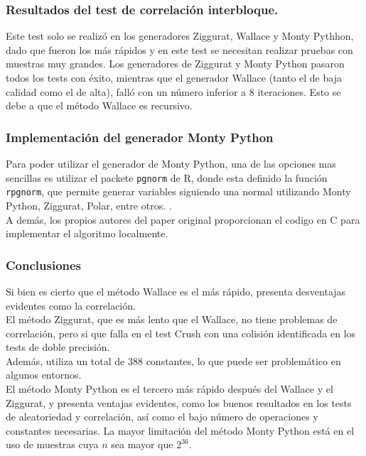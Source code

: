 \documentclass[a4paper,12pt]{article}
\begin{document}
	\subsubsection{Resultados del test de correlación interbloque.}
	Este test solo se realizó en los generadores Ziggurat, Wallace y Monty Pythhon, dado que fueron los más rápidos y en este test se necesitan realizar pruebas con muestras muy grandes. Los generadores de Ziggurat y Monty Python pasaron todos los tests con éxito, mientras que el generador Wallace (tanto el de baja calidad como el de alta), falló con un número inferior a $8$ iteraciones. Esto se debe a que el método Wallace es recursivo.
	
	\subsubsection{Implementación del generador Monty Python}
	Para poder utilizar el generador de Monty Python, una de las opciones mas sencillas es utilizar el packete \texttt{pgnorm} de R, donde esta definido la función \texttt{rpgnorm},
	que permite generar variables siguiendo una normal utilizando Monty Python, Ziggurat, Polar, entre otros. \cite{mp}. \\
	A demás, los propios autores del paper original proporcionan el codigo en C para implementar el algoritmo localmente.

	\subsubsection{Conclusiones}
	Si bien es cierto que el método Wallace es el más rápido, presenta desventajas evidentes como la correlación. \\
 
	El método Ziggurat, que es más lento que el Wallace, no tiene problemas de correlación, pero si que falla en el test Crush con una colisión identificada en los tests de doble precisión. \\
 
	Además, utiliza un total de $388$ constantes, lo que puede ser problemático en algunos entornos. \\
 
	El método Monty Python es el tercero más rápido después del Wallace y el Ziggurat, y presenta ventajas evidentes, como los buenos resultados en los tests de aleatoriedad y correlación, así como el bajo número de operaciones y constantes necesarias. 
	La mayor limitación del método Monty Python está en el uso de muestras cuya $n$ sea mayor que $2^{36}$. 
	
\end{document}
